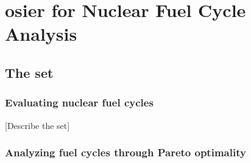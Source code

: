 \section{\gls{osier} for Nuclear Fuel Cycle Analysis}

\subsection{The \gls{set}}
\begin{frame}
    \frametitle{Evaluating nuclear fuel cycles}

    [Describe the \gls{set}]

\end{frame}

\begin{frame}
    \frametitle{Analyzing fuel cycles through Pareto optimality}
\end{frame}
